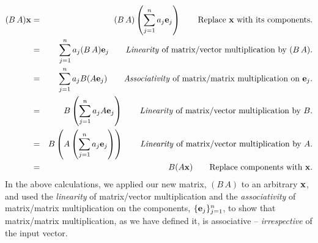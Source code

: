 \documentclass{article}
\begin{document}
\begin{eqnarray}
	(B\, A){\bf x} & = & (B \, A)\left(\sum_{j=1}^n a_j {\bf e}_j\right) \quad\quad \text{Replace ${\bf x}$ with its components.}\nonumber \\
				   & = &\sum_{j=1}^n a_j (B \, A){\bf e}_j \quad\quad \text{{\em Linearity\/} of matrix/vector multiplication by $(B \, A)$.}\nonumber \\
				   & = &\sum_{j=1}^n a_j B (A{\bf e}_j) \quad\quad \text{{\em Associativity\/} of matrix/matrix multiplication on ${\bf e}_j$.}\nonumber \\
				   & = &B\left(\sum_{j=1}^n a_j A{\bf e}_j\right) \quad\quad \text{{\em Linearity\/} of matrix/vector multiplication by $B$.}\nonumber \\
				   & = &B\left( A\left(\sum_{j=1}^n a_j {\bf e}_j\right)\right) \quad\quad \text{{\em Linearity\/} of matrix/vector multiplication by  $A$.}\nonumber \\
				   & = &B( A {\bf x}) \quad\quad \text{Replace components with ${\bf x}$.}
\end{eqnarray}
In the above calculations, we applied our new matrix, $(B \, A)$ to an arbitrary ${\bf x}$, and 
used the {\em linearity\/} of matrix/vector multiplication and the {\em associativity\/}
of matrix/matrix multiplication on the components, $\{{\bf e}_j\}_{j=1}^n$, to show that matrix/matrix
multiplication, as we have defined it, is associative -- {\em irrespective\/} of the input vector.
\end{document}

